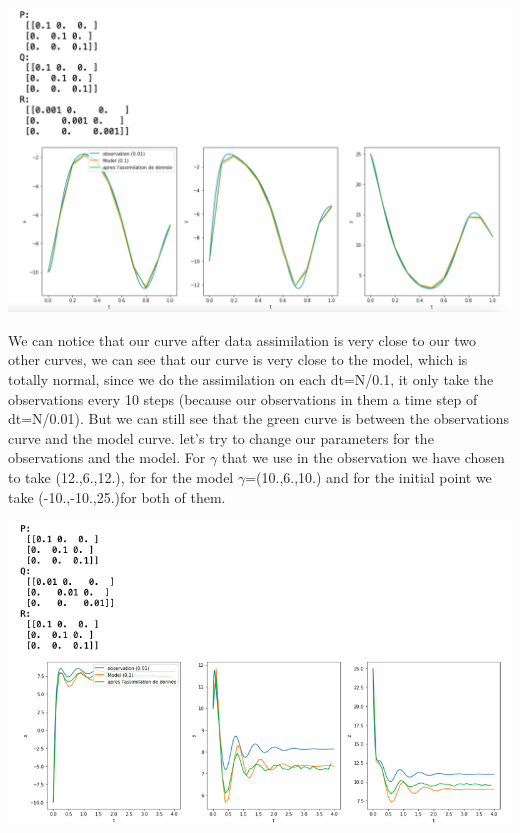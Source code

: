 \begin{center}
		\includegraphics[width=1\textwidth]{"images/lorenz1.png"}
\end{center}
We can notice that our curve after data assimilation is very close to our two other curves, we can see that our curve is very close to the model, which is totally normal, since we do the assimilation on each dt=N/0.1, it only take the observations every 10 steps (because our observations in them a time step of dt=N/0.01). But we can still see that the green curve is between the observations curve and the model curve.
\vspace*{5mm}
 let's try to change our parameters for the observations and the model. For $\gamma$ that we use in the observation we have chosen to take (12.,6.,12.), for for the model $\gamma$=(10.,6.,10.) and for the initial point we take (-10.,-10.,25.)for both of them.
 \begin{center}
		\includegraphics[width=1\textwidth]{"images/lorenz2.png"}
\end{center}
